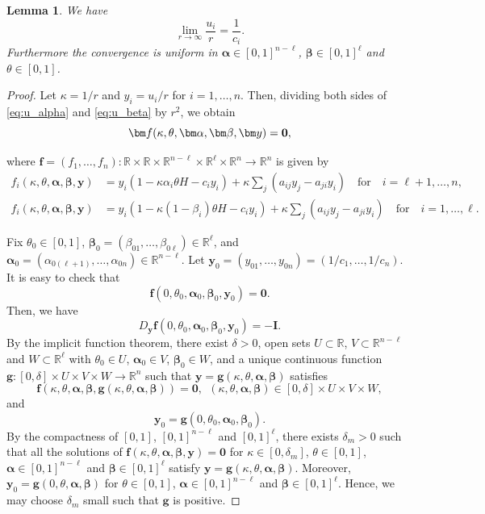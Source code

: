 \documentclass[11pt]{article}
\newtheorem{lemma}[theorem]{Lemma}
\theoremstyle{definition}
\begin{document}
\begin{lemma}\label{lemma:u_alpha}
We have
    \[
    \lim_{r\to\infty} \frac{u_i}{r} = \frac{1}{c_i}.
    \]
    Furthermore the convergence is uniform in $\bm\alpha\in [0, 1]^{n-\ell}$, $\bm\beta\in[0,1]^{\ell}$ and $\theta\in [0, 1]$.
\end{lemma}

\begin{proof}
    Let $\kappa=1/r$ and $y_i=u_i/r$ for $i=1, \dots, n$. Then, dividing both sides of \eqref{eq:u_alpha} and \eqref{eq:u_beta} by $r^2$, we obtain
    \[\bm f (\kappa, \theta, \bm\alpha, \bm\beta, \bm y) = \bf 0,\]

    where $\bm f=(f_1, \dots, f_n): \mathbb{R}\times\mathbb{R}\times \mathbb{R}^{n-\ell}\times \mathbb{R}^{\ell}\times \mathbb{R}^n\rightarrow \mathbb{R}^n$ is given by 
    \begin{align*}
        f_i(\kappa, \theta, \bm\alpha, \bm\beta, \bm y) & =y_i(1-\kappa\alpha_i\theta H-c_i y_i)+\kappa\sum_j(a_{ij}y_j-a_{ji}y_i) \quad \text{for} \quad  i=\ell+1,\dots, n,\\ f_{i}(\kappa, \theta, \bm\alpha, \bm\beta, \bm y) & =y_{i}(1-\kappa(1-\beta_i)\theta H-c_{i} y_{i})+\kappa\sum_j(a_{ij}y_j-a_{ji}y_{i}) \quad \text{for} \quad  i=1, \dots, \ell. 
    \end{align*}
    
    
     Fix $\theta_0\in[0, 1]$, $\bm \beta_0=(\beta_{01},\dots,\beta_{0\ell})\in \mathbb{R}^\ell$, and $\bm\alpha_0=(\alpha_{0(\ell+1)},\dots, \alpha_{0n})\in\mathbb{R}^{n-\ell}$. Let $\bm y_0=(y_{01},\dots, y_{0n})=(1/c_1,\dots, 1/c_n)$.  It is easy to check that 
    $$
\bm f(0, \theta_0, \bm\alpha_0, \bm\beta_0, \bm y_0)=\bm 0. 
    $$
    Then, we have 
    $$
D_{\bm y} \bm f(0, \theta_0, \bm\alpha_0, \bm\beta_0, \bm y_0)=-\bm I. 
    $$
By the implicit function theorem, there exist $\delta>0$, open sets $U\subset \mathbb{R}$, $V\subset \mathbb{R}^{n-\ell}$ and $W\subset \mathbb{R}^\ell$ with $\theta_0\in U$, $\bm\alpha_0\in V$, $\bm\beta_0\in W$, and a unique continuous function $\bm g: [0, \delta]\times U\times V\times W\to \mathbb{R}^n$ such that $\bm y=\bm g(\kappa, \theta, \bm\alpha, \bm\beta)$ satisfies 
$$
\bm f(\kappa, \theta, \bm\alpha, \bm\beta, \bm g(\kappa,\theta,\bm\alpha, \bm\beta))=\bm 0, \ \ (\kappa, \theta, \bm\alpha,\bm\beta)\in [0, \delta]\times U\times V\times W,
$$
and 
$$
\bm y_0=\bm g(0, \theta_0, \bm\alpha_0, \bm\beta_0). 
$$
By the compactness of $[0, 1]$, $[0, 1]^{n-\ell}$ and $[0, 1]^{\ell}$, there exists $\delta_m>0$ such that all the solutions of $\bm f(\kappa, \theta, \bm \alpha, \bm\beta, \bm y)=\bm 0$ for $\kappa\in [0, \delta_m]$, $\theta\in [0, 1]$, $\bm\alpha\in [0, 1]^{n-\ell}$ and $\bm\beta\in [0, 1]^\ell$ satisfy $\bm y=\bm g(\kappa, \theta, \bm\alpha,\bm\beta)$. Moreover, $\bm y_0=\bm g(0, \theta, \bm\alpha,\bm\beta)$ for $\theta\in [0, 1]$, $\bm \alpha\in [0, 1]^{n-\ell}$ and $\bm\beta\in[0, 1]^{\ell}$. Hence, we may choose $\delta_m$ small such that $\bm g$ is positive. 


\end{proof}
\end{document}
